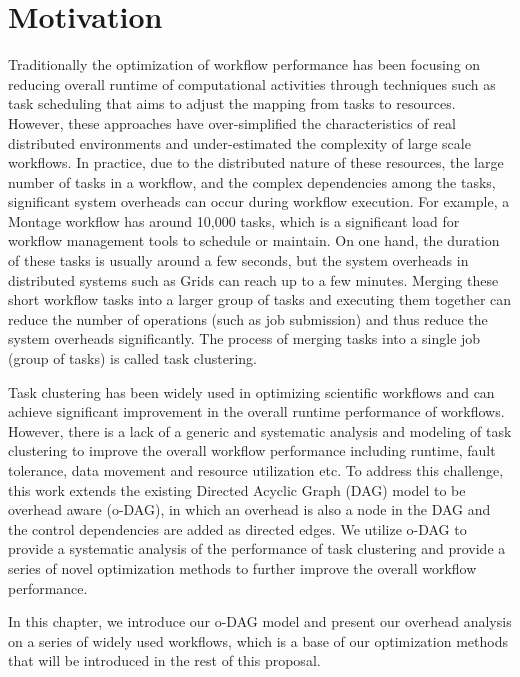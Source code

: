 \section{Motivation}

Traditionally the optimization of workflow performance has been focusing on reducing overall runtime of computational activities through techniques such as  task scheduling that aims to adjust the mapping from tasks to resources. However, these approaches have over-simplified the characteristics of real distributed environments and under-estimated the complexity of large scale workflows. In practice, due to the distributed nature of these resources, the large number of tasks in a workflow, and the complex dependencies among the tasks, significant system overheads can occur during workflow execution. For example, a Montage workflow has around 10,000 tasks, which is a significant load for workflow management tools to schedule or maintain. On one hand, the duration of these tasks is usually around a few seconds, but the system overheads in distributed systems such as Grids can reach up to a few minutes. Merging these short workflow tasks into a larger group of tasks and executing them together can reduce the number of operations (such as job submission) and thus reduce the system overheads significantly. The process of merging tasks into a single job (group of tasks) is called task clustering. 

Task clustering has been widely used in optimizing scientific workflows and can achieve significant improvement in the overall runtime performance \cite{Rynge2012, Singh2008, Li2011, Cao2008} of workflows. However,  there is a lack of a generic and systematic analysis and modeling of task clustering to improve the overall workflow performance including runtime, fault tolerance, data movement and resource utilization etc. To address this challenge, this work extends the existing Directed Acyclic Graph (DAG) model to be overhead aware (o-DAG), in which an overhead is also a node in the DAG and the control dependencies are added as directed edges. We utilize o-DAG to provide a systematic analysis of the performance of task clustering and provide a series of novel optimization methods to further improve the overall workflow performance. 


In this chapter, we introduce our o-DAG model and present our overhead analysis on a series of widely used workflows, which is a base of our optimization methods that will be introduced in the rest of this proposal. 

